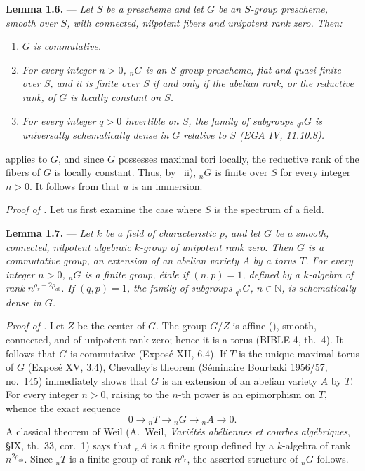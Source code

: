 \medskip
\noindent{}%
\textbf{Lemma 1.6.} --- \textit{Let \(S\) be a prescheme and let
\(G\) be an \(S\)-group prescheme, smooth over \(S\), with connected,
nilpotent fibers and unipotent rank zero. Then:}
\begin{enumerate}
\item[\textit{i)}] \textit{\(G\) is commutative.}
\item[\textit{ii)}] \textit{For every integer \(n>0\),
\({}_{n}G\) is an \(S\)-group prescheme, flat and quasi-finite over
\(S\), and it is finite over \(S\) if and only if the abelian rank,
or the reductive rank, of \(G\) is locally constant on \(S\).}
\item[\textit{iii)}] \textit{For every integer \(q>0\) invertible on
\(S\), the family of subgroups \({}_{q^n}G\) is universally
schematically dense in \(G\) relative to \(S\) (EGA IV, 11.10.8).}
\end{enumerate}

 applies to \(G\), and since \(G\) possesses maximal tori
locally, the reductive rank of the fibers of \(G\) is locally
constant. Thus, by ~ii), \({}_{n}G\) is finite over \(S\) for
every integer \(n>0\). It follows from  that \(u\) is
an immersion.

\medskip
\noindent\textit{Proof of .}
Let us first examine the case where \(S\) is the spectrum of a field.

\medskip
\noindent{}%
\textbf{Lemma 1.7.} --- \textit{Let \(k\) be a field of
characteristic \(p\), and let \(G\) be a smooth, connected, nilpotent
algebraic \(k\)-group of unipotent rank zero. Then \(G\) is a
commutative group, an extension of an abelian variety \(A\) by a
torus \(T\). For every integer \(n>0\), \({}_{n}G\) is a finite
group, étale if \((n,p)=1\), defined by a \(k\)-algebra of rank
\(n^{\rho_r+2\rho_{ab}}\). If \((q,p)=1\), the family of subgroups
\({}_{q^n}G\), \(n\in\mathbb N\), is schematically dense in \(G\).}

\smallskip
\noindent\textit{Proof of .}
Let \(Z\) be the center of \(G\). The group \(G/Z\) is affine
(), smooth, connected, and of unipotent rank zero;
hence it is a torus (BIBLE 4, th.~4). It follows that \(G\) is
commutative (Exposé XII, 6.4). If \(T\) is the unique maximal torus
of \(G\) (Exposé XV, 3.4), Chevalley's theorem (Séminaire Bourbaki
1956/57, no.~145) immediately shows that \(G\) is an extension of an
abelian variety \(A\) by \(T\). For every integer \(n>0\), raising to
the \(n\)-th power is an epimorphism on \(T\), whence the exact
sequence
\[
  0\longrightarrow {}_{n}T\longrightarrow {}_{n}G
  \longrightarrow {}_{n}A\longrightarrow 0.
\]
A classical theorem of Weil (A.~Weil, \emph{Variétés abéliennes et
courbes algébriques}, \S IX, th.~33, cor.~1) says that \({}_{n}A\)
is a finite group defined by a \(k\)-algebra of rank
\(n^{2\rho_{ab}}\). Since \({}_{n}T\) is a finite group of rank
\(n^{\rho_r}\), the asserted structure of \({}_{n}G\) follows.

